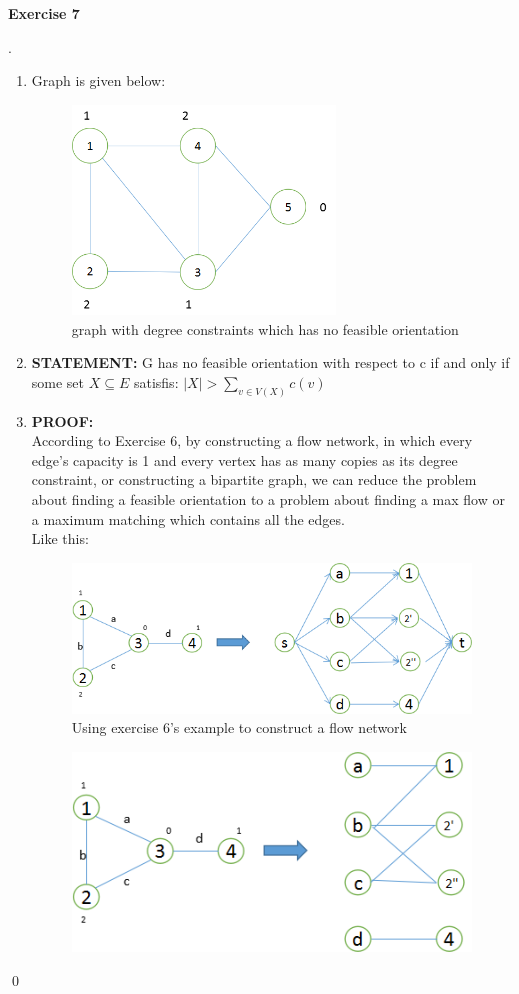 \documentclass[12pt, notitlepage]{article}
\newenvironment{sol}
  {\par\vspace{3mm}\noindent{\it Solution}.}{\qed}
\begin{document}
\textbf{Exercise 7}
\begin{sol}
\begin{enumerate}[1.]
\item
Graph is given below:
\begin{figure}[H]\centering
	\includegraphics[width=7cm]{1.png}
	\caption{graph with degree constraints which has no feasible orientation}
\end{figure}
\item
\textbf{STATEMENT:} G has no feasible orientation with respect to c if and only if some set $X\subseteq E$ satisfis: $|X|>\sum_{v\in V(X)}c(v)$
\item
\textbf{PROOF:} \\
According to Exercise 6, by constructing a flow network, in which every edge's capacity is 1 and every vertex has as many copies as its degree constraint, or constructing a bipartite graph, we can reduce the problem about finding a feasible orientation to a problem about finding a max flow or a maximum matching which contains all the edges.\\
Like this:
\begin{figure}[H]\centering
	\includegraphics[width=12cm]{2.png}
	\caption{Using exercise 6's example to construct a flow network}
\end{figure}
\begin{figure}[H]\centering
	\includegraphics[width=12cm]{3.png}

\end{figure}
\end{enumerate}
\end{sol}
\end{document}
